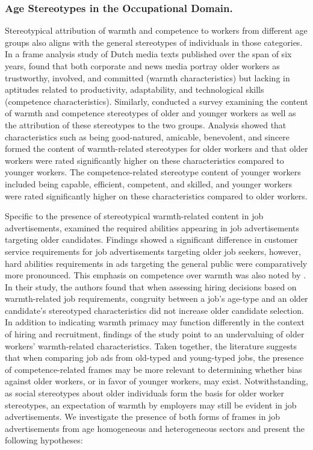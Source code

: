 \documentclass[jou]{apa7}
\begin{document}
\subsubsection{Age Stereotypes in the Occupational Domain.}
\label{age_stereotypes_in_the_occupational_domain}

Stereotypical attribution of warmth and competence to workers from different age groups also aligns with the general stereotypes of individuals in those categories. In a frame analysis study of Dutch media texts published over the span of six years, \textcite{kroonReliableUnproductiveStereotypes2018} found that both corporate and news media portray older workers as trustworthy, involved, and committed (warmth characteristics) but lacking in aptitudes related to productivity, adaptability, and technological skills (competence characteristics). Similarly, \textcite{kringsStereotypicalInferencesMediators2011} conducted a survey examining the content of warmth and competence stereotypes of older and younger workers as well as the attribution of these stereotypes to the two groups. Analysis showed that characteristics such as being good-natured, amicable, benevolent, and sincere formed the content of warmth-related stereotypes for older workers and that older workers were rated significantly higher on these characteristics compared to younger workers. The competence-related stereotype content of younger workers included being capable, efficient, competent, and skilled, and younger workers were rated significantly higher on these characteristics compared to older workers.

Specific to the presence of stereotypical warmth-related content in job advertisements, \textcite{vanselmSearchOlderWorker2021} examined the required abilities appearing in job advertisements targeting older candidates. Findings showed a significant difference in customer service requirements for job advertisements targeting older job seekers, however, hard abilities requirements in ads targeting the general public were comparatively more pronounced. This emphasis on competence over warmth was also noted by \textcite{abramsOldUnemployableHow2016}. In their study, the authors found that when assessing hiring decisions based on warmth-related job requirements, congruity between a job’s age-type and an older candidate’s stereotyped characteristics did not increase older candidate selection. In addition to indicating warmth primacy may function differently in the context of hiring and recruitment, findings of the study point to an undervaluing of older workers’ warmth-related characteristics. Taken together, the literature suggests that when comparing job ads from old-typed and young-typed jobs, the presence of competence-related frames may be more relevant to determining whether bias against older workers, or in favor of younger workers, may exist. Notwithstanding, as social stereotypes about older individuals form the basis for older worker stereotypes, an expectation of warmth by employers may still be evident in job advertisements. We investigate the presence of both forms of frames in job advertisements from age homogeneous and heterogeneous sectors and present the following hypotheses:
\end{document}
